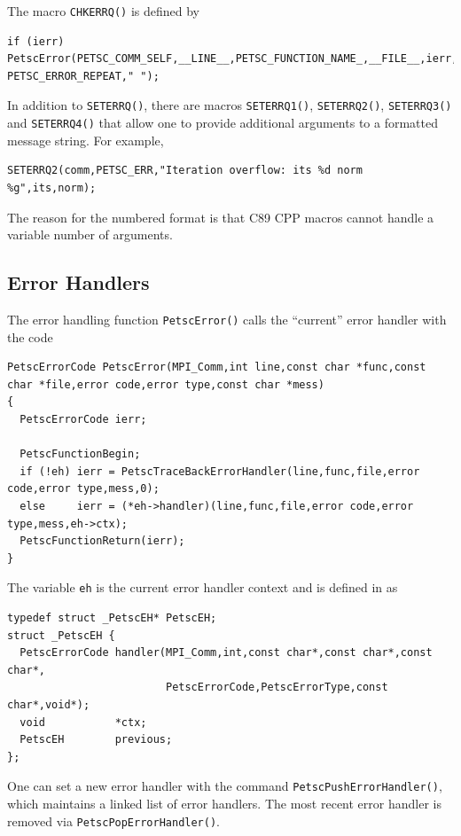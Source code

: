 The macro \lstinline{CHKERRQ()} is defined by
\begin{lstlisting}
if (ierr) PetscError(PETSC_COMM_SELF,__LINE__,PETSC_FUNCTION_NAME_,__FILE__,ierr, PETSC_ERROR_REPEAT," ");
\end{lstlisting}

In addition to \lstinline{SETERRQ()}, there are macros \lstinline{SETERRQ1()}, \lstinline{SETERRQ2()}, \lstinline{SETERRQ3()}
and \lstinline{SETERRQ4()} that allow one to provide additional arguments to a formatted message string. For example,
\begin{lstlisting}
SETERRQ2(comm,PETSC_ERR,"Iteration overflow: its %d norm %g",its,norm);
\end{lstlisting}
The reason for the numbered format is that C89 CPP macros cannot handle a variable number
of arguments.

\subsection{Error Handlers}
The error handling function \lstinline{PetscError()} calls the ``current'' error handler
with the code
\begin{lstlisting}
PetscErrorCode PetscError(MPI_Comm,int line,const char *func,const char *file,error code,error type,const char *mess)
{
  PetscErrorCode ierr;

  PetscFunctionBegin;
  if (!eh) ierr = PetscTraceBackErrorHandler(line,func,file,error code,error type,mess,0);
  else     ierr = (*eh->handler)(line,func,file,error code,error type,mess,eh->ctx);
  PetscFunctionReturn(ierr);
}
\end{lstlisting}
The variable \lstinline{eh} is the current error handler context and is defined in
 \href{http://www.mcs.anl.gov/petsc/petsc-master/src/sys/error/err.c.html}{} as
\begin{lstlisting}
typedef struct _PetscEH* PetscEH;
struct _PetscEH {
  PetscErrorCode handler(MPI_Comm,int,const char*,const char*,const char*,
                         PetscErrorCode,PetscErrorType,const char*,void*);
  void           *ctx;
  PetscEH        previous;
};
\end{lstlisting}

One can set a new error handler with the command \lstinline{PetscPushErrorHandler()},
which maintains a linked list of error handlers.
The most recent error handler is removed
via \lstinline{PetscPopErrorHandler()}.


